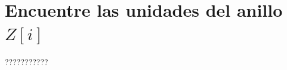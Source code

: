 \documentclass[10pt,a4paper]{article} %
\begin{document}
            \section{Encuentre las unidades del anillo $ Z[i]  $  }
                ???????????
























    \nocite{*}
    
    
\end{document}
